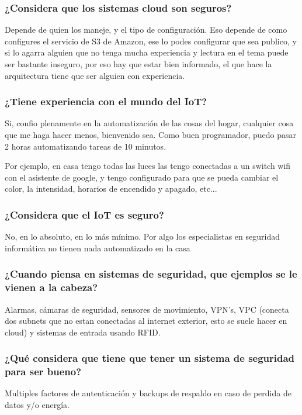 \documentclass{article}
\begin{document}
\subsubsection{¿Considera que los sistemas cloud son seguros?}
Depende de quien los maneje, y el tipo de configuración. Eso depende de como configures el servicio de S3 de Amazon, ese lo podes configurar que sea publico, y si lo agarra alguien que no tenga mucha experiencia y lectura en el tema puede ser bastante inseguro, por eso hay que estar bien informado, el que hace la arquitectura tiene que ser alguien con experiencia.

\subsubsection{¿Tiene experiencia con el mundo del IoT?}
Si, confio plenamente en la automatización de las cosas del hogar, cualquier cosa que me haga hacer menos, bienvenido sea. Como buen programador, puedo pasar 2 horas automatizando tareas de 10 minutos.

Por ejemplo, en casa tengo todas las luces las tengo conectadas a un switch wifi con el asistente de google, y tengo configurado para que se pueda cambiar el color, la intensidad, horarios de encendido y apagado, etc...

\subsubsection{¿Considera que el IoT es seguro?}
No, en lo absoluto, en lo más mínimo. Por algo los especialistas en seguridad informática no tienen nada automatizado en la casa

\subsubsection{¿Cuando piensa en sistemas de seguridad, que ejemplos se le vienen a la cabeza?}
Alarmas, cámaras de seguridad, sensores de movimiento, VPN's, VPC (conecta dos subnets que no estan conectadas al internet exterior, esto se suele hacer en cloud) y sistemas de entrada usando RFID.

\subsubsection{¿Qué considera que tiene que tener un sistema de seguridad para ser bueno?}
Multiples factores de autenticación y backups de respaldo en caso de perdida de datos y/o energía.
\end{document}
